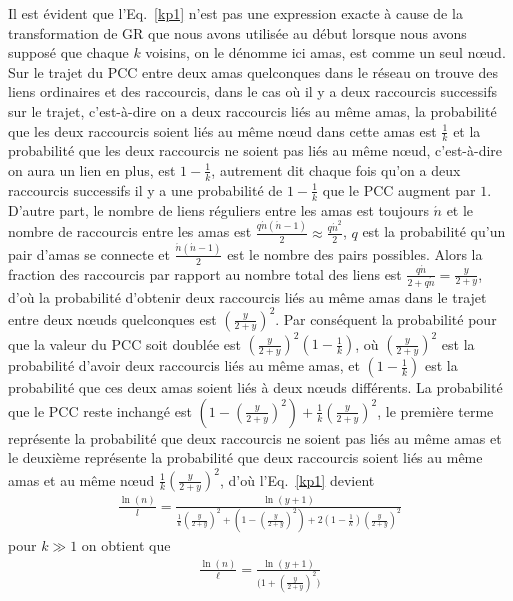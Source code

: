Il est évident que l'Eq.~\eqref{kp1} n'est pas une expression exacte à cause de la transformation de GR que nous avons utilisée au début lorsque nous avons supposé que chaque $k$ voisins, on le dénomme ici \textsf{amas}, est comme  un seul nœud.\\
Sur le trajet du PCC entre deux amas quelconques dans le réseau on trouve des liens ordinaires et des raccourcis, dans le cas où il y a deux raccourcis successifs sur le trajet, c'est-à-dire on a deux raccourcis liés au m\^{e}me \textsf{amas}, la probabilité que les deux raccourcis soient liés au m\^{e}me nœud dans cette amas est $\frac{1}{k}$ et la probabilité que les deux raccourcis ne soient pas liés au m\^{e}me nœud, c'est-à-dire on aura un lien en plus, est  $1-\frac{1}{k}$, autrement dit chaque fois qu'on a deux raccourcis successifs il y a une probabilité de $1-\frac{1}{k}$ que le PCC augment par $1$.\\
D'autre part, le nombre de liens réguliers entre les \textsf{amas} est toujours
$\acute{n}$ et le nombre de raccourcis entre les \textsf{amas} est $\frac{q\acute{n}(\acute{n}-1)}{2}\approx\frac{q\acute{n}^2}{2}$, 
$q$ est la probabilité qu'un pair d'amas se connecte et $\frac{\acute{n}(\acute{n}-1)}{2}$ est le nombre des pairs possibles. Alors la fraction des raccourcis par rapport au nombre total des liens est $\frac{q\acute{n}}{2+q\acute{n}}=\frac{y}{2+y}$, d'où la probabilité d'obtenir deux raccourcis liés au m\^{e}me \textsf{amas} dans le trajet entre deux nœuds quelconques est $(\frac{y}{2+y})^2$. Par conséquent la probabilité pour que la valeur du PCC soit doublée est $(\frac{y}{2+y})^2(1-\frac{1}{k})$, où $(\frac{y}{2+y})^2$ est la probabilité d'avoir deux 
raccourcis liés au m\^{e}me \textsf{amas}, et $(1-\frac{1}{k})$ est la probabilité que ces deux amas soient liés à deux nœuds différents. La probabilité que le PCC reste inchangé est $(1-(\frac{y}{2+y})^2)+\frac{1}{k}(\frac{y}{2+y})^2$, le première terme représente la probabilité que deux raccourcis ne soient pas liés au m\^{e}me \textsf{amas} et le deuxième représente la probabilité 
que deux raccourcis soient liés au m\^{e}me \textsf{amas} et au m\^{e}me nœud $\frac{1}{k}(\frac{y}{2+y})^2$, d'où l'Eq.~\eqref{kp1} devient
\begin{eqnarray}
\frac{\ln(n)}{l}=\frac{\ln(y+1)}{\frac{1}{k}(\frac{y}{2+y})^2+(1-(\frac{y}{2+y})^2)+2(1-\frac{1}{k})(\frac{y}{2+y})^2}
\end{eqnarray}
pour $k\gg1$ on obtient que
\begin{eqnarray}
\frac{\ln(n)}{\ell}=\frac{\ln(y+1)}{\big(1+(\frac{y}{2+y})^2\big)}
\label{kp2}
\end{eqnarray}
